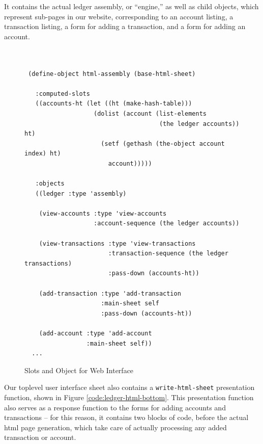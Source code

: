 \documentclass [11pt]{book}
\begin{document}
It contains the actual ledger assembly, or ``engine,'' as well as child objects, which
represent sub-pages in our website, corresponding to an account listing, a transaction
listing, a form for adding a transaction, and a form for adding an account.
\begin{figure}
\begin{lrbox}{\boxedverb}
\begin{minipage}{\linewidth}

\begin{verbatim}


 (define-object html-assembly (base-html-sheet)
  
   :computed-slots 
   ((accounts-ht (let ((ht (make-hash-table)))
                   (dolist (account (list-elements 
                                     (the ledger accounts)) ht)
                     (setf (gethash (the-object account index) ht) 
                       account)))))
  
   :objects
   ((ledger :type 'assembly)
  
    (view-accounts :type 'view-accounts
                   :account-sequence (the ledger accounts))
   
    (view-transactions :type 'view-transactions
                       :transaction-sequence (the ledger transactions)
                       :pass-down (accounts-ht))
   
    (add-transaction :type 'add-transaction
                     :main-sheet self
                     :pass-down (accounts-ht))
   
    (add-account :type 'add-account
                 :main-sheet self))
  ...

\end{verbatim}
\end{minipage}
\end{lrbox}
\fbox{\usebox{\boxedverb}}

\caption{Slots and Object for Web Interface}

\label{code:ledger-html-top}

\end{figure}
Our toplevel user interface sheet also contains a \texttt{write-html-sheet} presentation function, shown in Figure 
\ref{code:ledger-html-bottom}. This presentation function also serves as a response function
to the forms for adding accounts and transactions -- for this reason, 
it contains two blocks of code, before the actual html page generation,
which take care of actually processing any added transaction or account.
\end{document}
